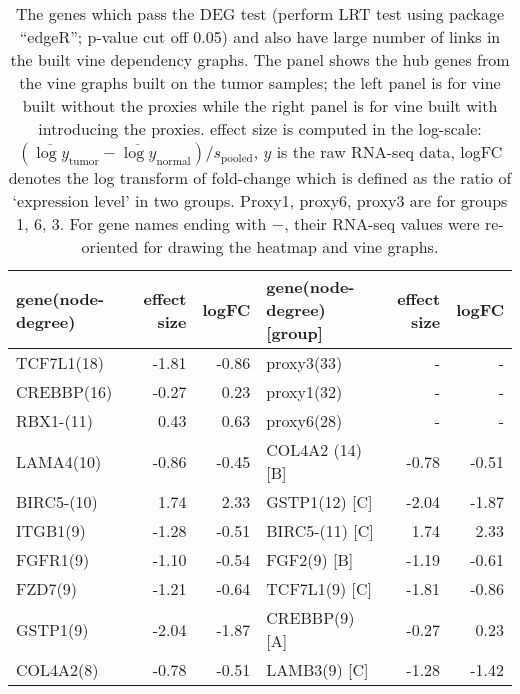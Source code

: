 \documentclass[a4paper]{article}
\begin{document}
\begin{table}[!ht]
\centering
\caption{\footnotesize{The genes which pass the DEG test (perform LRT test using package ``edgeR''; p-value cut off 0.05) and also have large number of links in the built vine dependency graphs. 
The panel shows the hub genes from the vine graphs built on the tumor samples; the left panel is for vine built without the proxies while the right panel is for vine built with introducing the proxies. effect size is computed in the log-scale: $(\overline{\log y}_{\text{tumor}}-\overline{\log y}_{\text{normal}})/s_{\text{pooled}}$, $y$ is the raw RNA-seq data, logFC denotes the log transform of fold-change which is defined as the ratio of `expression level' in two groups.
Proxy1, proxy6, proxy3 are for groups 1, 6, 3.
For gene names ending with $-$, their RNA-seq values were re-oriented for drawing the heatmap and vine graphs.
}}
\begin{tabular}{lrr|lrr}
\toprule
gene(node-degree)& \multicolumn{1}{r}{effect size}  
& \multicolumn{1}{r|}{logFC} & gene(node-degree)[group] &effect size& logFC     \\ 
\hline
TCF7L1(18) & \multicolumn{1}{r}{-1.81}  & \multicolumn{1}{r|}{-0.86} & proxy3(33)                         &      - &   -    \\ 
CREBBP(16) & \multicolumn{1}{r}{-0.27}  & \multicolumn{1}{r|}{0.23} & proxy1(32)                         &      - &   -    \\ 
RBX1-(11)& \multicolumn{1}{r}{0.43}  & \multicolumn{1}{r|}{0.63} & proxy6(28)                         &      - &   -    \\ 
LAMA4(10)& \multicolumn{1}{r}{-0.86}  & \multicolumn{1}{r|}{-0.45} & COL4A2 (14) [B]                    & -0.78 & -0.51 \\ 
BIRC5-(10)& \multicolumn{1}{r}{1.74}  & \multicolumn{1}{r|}{2.33} &  GSTP1(12)  [C]
&-2.04 & -1.87 \\ 
ITGB1(9)& \multicolumn{1}{r}{-1.28}  & \multicolumn{1}{r|}{-0.51} &  BIRC5-(11)  [C]                    & 1.74 & 2.33 \\ 
FGFR1(9)& \multicolumn{1}{r}{-1.10}  & \multicolumn{1}{r|}{-0.54} &  FGF2(9)   [B]                   & -1.19 & -0.61 \\
FZD7(9)& \multicolumn{1}{r}{-1.21}  & \multicolumn{1}{r|}{-0.64} &  TCF7L1(9)  [C]     & -1.81 & -0.86 \\
GSTP1(9)& \multicolumn{1}{r}{-2.04}  & \multicolumn{1}{r|}{-1.87} & CREBBP(9)   [A]                   & -0.27 & 0.23 \\
COL4A2(8)& \multicolumn{1}{r}{-0.78}  & \multicolumn{1}{r|}{-0.51} &  LAMB3(9) [C]  & -1.28 & -1.42 \\

\end{tabular}
\end{table}
\end{document}
